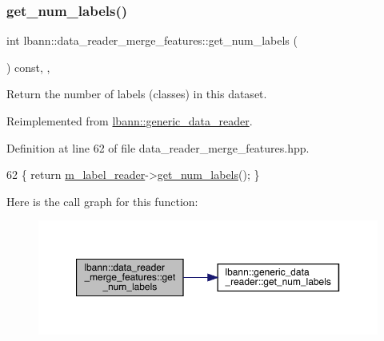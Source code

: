 \subsubsection{\texorpdfstring{get\+\_\+num\+\_\+labels()}{get\_num\_labels()}}
{\footnotesize\ttfamily int lbann\+::data\+\_\+reader\+\_\+merge\+\_\+features\+::get\+\_\+num\+\_\+labels (\begin{DoxyParamCaption}{ }\end{DoxyParamCaption}) const\hspace{0.3cm}{\ttfamily [inline]}, {\ttfamily [override]}, {\ttfamily [virtual]}}



Return the number of labels (classes) in this dataset. 



Reimplemented from \hyperlink{classlbann_1_1generic__data__reader_a935ce6262d75f1834e550c3bc16a6547}{lbann\+::generic\+\_\+data\+\_\+reader}.



Definition at line 62 of file data\+\_\+reader\+\_\+merge\+\_\+features.\+hpp.


\begin{DoxyCode}
62 \{ \textcolor{keywordflow}{return} \hyperlink{classlbann_1_1data__reader__merge__features_a1e54a136c63b934f44ff91dc68ea3b27}{m\_label\_reader}->\hyperlink{classlbann_1_1generic__data__reader_a935ce6262d75f1834e550c3bc16a6547}{get\_num\_labels}(); \}
\end{DoxyCode}
Here is the call graph for this function\+:\nopagebreak
\begin{figure}[H]
\begin{center}
\leavevmode
\includegraphics[width=350pt]{classlbann_1_1data__reader__merge__features_a63be746ea35e664b5cc8f8b973e86209_cgraph}
\end{center}
\end{figure}
\mbox{\label{classlbann_1_1data__reader__merge__features_affcf91a640f964ba18de9cb650fb07ad}} 
